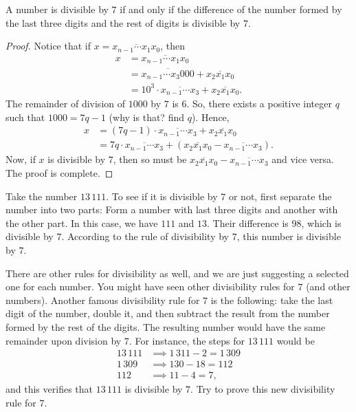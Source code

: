 \documentclass{subfile}
\begin{document}
\begin{proposition}[Divisibility by $7$]\label{prop:divisibility-7}
	A number is divisible by $7$ if and only if the difference of the number formed by the last three digits and the rest of digits is divisible by $7$.
\end{proposition}

\begin{proof}
	Notice that if $x = \overline{x_{n-1} \cdots x_1 x_0 }$, then
		\begin{align*}
			x &= \overline{x_{n-1} \cdots x_1 x_0 }\\
			  &= \overline{x_{n-1} \cdots x_3 000 } +  \overline{x_{2} x_1 x_0 }\\
			  &= 10^3 \cdot \overline{x_{n-1} \cdots x_3} +  \overline{x_{2} x_1 x_0 }.
		\end{align*}
	The remainder of division of $1000$ by $7$ is $6$. So, there exists a positive integer $q$ such that $1000 = 7q - 1$ (why is that? find $q$). Hence,
		\begin{align*}
			x &= (7q-1) \cdot \overline{x_{n-1} \cdots x_3} +  \overline{x_{2} x_1 x_0 }\\
			  &= 7q \cdot \overline{x_{n-1} \cdots x_3} + \left(\overline{x_{2} x_1 x_0 } - \overline{x_{n-1} \cdots x_3}\right).
		\end{align*}
	Now, if $x$ is divisible by $7$, then so must be $\overline{x_{2} x_1 x_0 } - \overline{x_{n-1} \cdots x_3}$ and vice versa. The proof is complete.
\end{proof}


\begin{example}
	Take the number $13\, 111$. To see if it is divisible by $7$ or not, first separate the number into two parts: Form a number with last three digits and another with the other part. In this case, we have $111$ and $13$. Their difference is $98$, which is divisible by $7$. According to the rule of divisibility by $7$, this number is divisible by $7$.
\end{example}

There are other rules for divisibility as well, and we are just suggesting a selected one for each number. You might have seen other divisibility rules for $7$ (and other numbers). Another famous divisibility rule for $7$ is the following: take the last digit of the number, double it, and then subtract the result from the number formed by the rest of the digits. The resulting number would have the same remainder upon division by $7$. For instance, the steps for $13\, 111$ would be
	\begin{align*}
		13\, 111 & \implies 1\,311 - 2 = 1\, 309\\
		1\, 309  & \implies 130 - 18 = 112\\
		112 &\implies 11 - 4 = 7,
	\end{align*}
and this verifies that $13\, 111$ is divisible by $7$. Try to prove this new divisibility rule for $7$.
\end{document}

